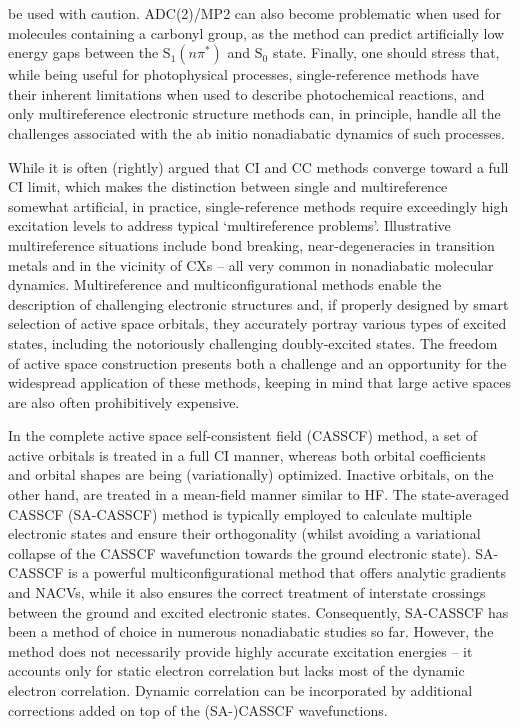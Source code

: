 \documentclass[9pt,bestpractices]{livecoms}
\begin{document}
be used with caution.\cite{plasser2015high} ADC(2)/MP2 can also become problematic when used for molecules containing a carbonyl group, as the method can predict artificially low energy gaps between the S$_1(n\pi^\ast)$ and S$_0$ state.\cite{marsili2021caveat} Finally, one should stress that, while being useful for photophysical processes, single-reference methods have their inherent limitations when used to describe photochemical reactions, and only multireference electronic structure methods can, in principle, handle all the challenges associated with the ab initio nonadiabatic dynamics of such processes.

 While it is often (rightly) argued that CI and CC methods converge toward a full CI limit,\cite{bartlett2017cc} which makes the distinction between single and multireference somewhat artificial, in practice, single-reference methods require exceedingly high excitation levels to address typical `multireference problems'. Illustrative multireference situations include bond breaking, near-degeneracies in transition metals and in the vicinity of CXs -- all very common in nonadiabatic molecular dynamics. Multireference and multiconfigurational methods enable the description of challenging electronic structures and, if properly designed by smart selection of active space orbitals, they accurately portray various types of excited states, including the notoriously challenging doubly-excited states. The freedom of active space construction presents both a challenge and an opportunity for the widespread application of these methods, keeping in mind that large active spaces are also often prohibitively expensive.

In the complete active space self-consistent field (CASSCF) method, a set of active orbitals is treated in a full CI manner, whereas both orbital coefficients and orbital shapes are being (variationally) optimized. Inactive orbitals, on the other hand, are treated in a mean-field manner similar to HF. The state-averaged CASSCF (SA-CASSCF) method is typically employed to calculate multiple electronic states and ensure their orthogonality (whilst avoiding a variational collapse of the CASSCF wavefunction towards the ground electronic state). SA-CASSCF is a powerful multiconfigurational method that offers analytic gradients and NACVs, while it also ensures the correct treatment of interstate crossings between the ground and excited electronic states. Consequently, SA-CASSCF has been a method of choice in numerous nonadiabatic studies so far.\cite{crespo2018recent,gonzalez_quantum_2021,gonzalez2012progress} However, the method does not necessarily provide highly accurate excitation energies -- it accounts only for static electron correlation but lacks most of the dynamic electron correlation. Dynamic correlation can be incorporated by additional corrections added on top of the (SA-)CASSCF wavefunctions.
\end{document}
